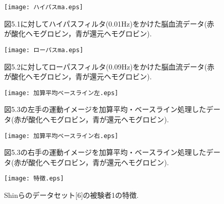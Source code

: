 \documentclass[a4j,12pt]{jreport}
\begin{document}
\begin{figure}[t]
  \begin{center}
    \texttt{[image: ハイパスma.eps]}
    \caption{図5.1に対してハイパスフィルタ(0.01Hz)をかけた脳血流データ(赤が酸化ヘモグロビン，青が還元ヘモグロビン).}
    \label{fig}
  \end{center}
\end{figure}

\begin{figure}[t]
  \begin{center}
    \texttt{[image: ローパスma.eps]}
    \caption{図5.2に対してローパスフィルタ(0.09Hz)をかけた脳血流データ(赤が酸化ヘモグロビン，青が還元ヘモグロビン).}
    \label{fig}
  \end{center}
\end{figure}

\begin{figure}[t]
  \begin{center}
    \texttt{[image: 加算平均ベースライン左.eps]}
    \caption{図5.3の左手の運動イメージを加算平均・ベースライン処理したデータ(赤が酸化ヘモグロビン，青が還元ヘモグロビン).}
    \label{fig}
  \end{center}
\end{figure}

\begin{figure}[t]
  \begin{center}
    \texttt{[image: 加算平均ベースライン右.eps]}
    \caption{図5.3の右手の運動イメージを加算平均・ベースライン処理したデータ(赤が酸化ヘモグロビン，青が還元ヘモグロビン).}
    \label{fig}
  \end{center}
\end{figure}

\begin{figure}[t]
  \begin{center}
    \texttt{[image: 特徴.eps]}
    \caption{Shinらのデータセット[6]の被験者1の特徴.}
    \label{fig}
  \end{center}
\end{figure}
\end{document}
